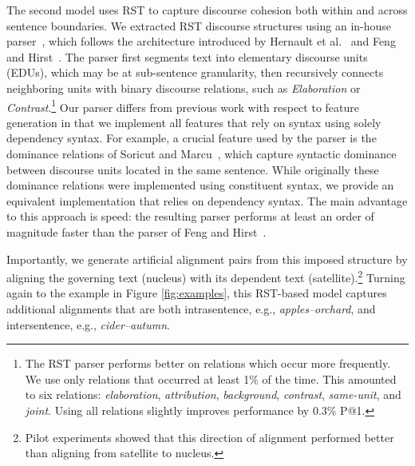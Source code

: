 The second model uses RST to capture discourse cohesion both within and across sentence boundaries.  
We extracted RST discourse structures using an in-house parser~\cite{Surdeanu:15}, which follows the architecture introduced by Hernault et al.~\citeyear{hernault10} and Feng and Hirst~\citeyear{feng12}.
The parser first segments text into elementary discourse units (EDUs), which may be at sub-sentence granularity, then recursively connects neighboring units with binary discourse relations, such as \emph{Elaboration} or \emph{Contrast}.\footnote{The RST parser performs better on relations which occur more frequently.  We use only relations that occurred at least 1\% of the time.  This amounted to six relations: \emph{elaboration}, \emph{attribution}, \emph{background}, \emph{contrast}, \emph{same-unit}, and \emph{joint}. Using all relations slightly improves performance by 0.3\% P@1.} Our parser differs from previous work with respect to feature generation in that we implement all features that rely on syntax using solely dependency syntax. For example, a crucial feature used by the parser is the dominance relations of Soricut and Marcu~\citeyear{soricut2003}, which capture syntactic dominance between discourse units located in the same sentence. While originally these dominance relations were implemented using constituent syntax, we provide an equivalent implementation that relies on dependency syntax. The main advantage to this approach is speed: the resulting parser performs at least an order of magnitude faster than the parser of Feng and Hirst~\citeyear{feng12}. 

Importantly, we generate artificial alignment pairs from this imposed structure by aligning the governing text (nucleus) with its dependent text (satellite).\footnote{Pilot experiments showed that this direction of alignment performed better than aligning from satellite to nucleus.} 
 Turning again to the example in Figure \ref{fig:examples}, this RST-based model captures additional alignments that are both intrasentence, e.g., \emph{apples--orchard}, and intersentence, e.g., {\em cider--autumn}. 


